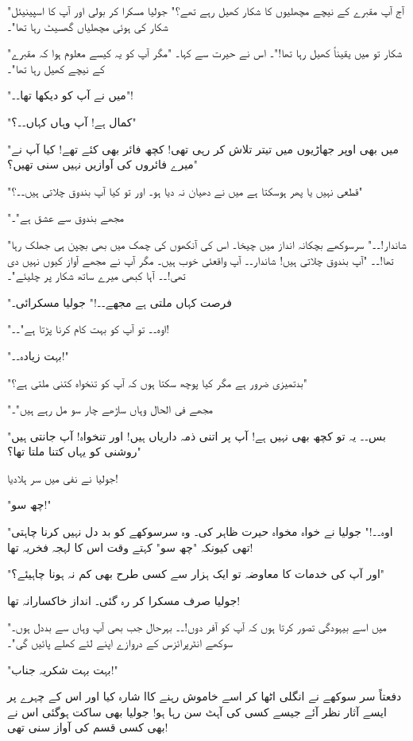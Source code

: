 "آج آپ مقبرے کے نیچے مچھلیوں کا شکار کھیل رہے تھے؟" جولیا مسکرا کر بولی اور آپ کا اسپینیئل شکار کی ہوئی مچھلیاں گھسیٹ رہا تھا"۔

"شکار تو میں یقیناً کھیل رہا تھا!"۔ اس نے حیرت سے کہا۔ "مگر آپ کو یہ کیسے معلوم ہوا کہ مقبرے کے نیچے کھیل رہا تھا"۔

"میں نے آپ کو دیکھا تھا۔۔"!

"کمال ہے! آپ وہاں کہاں۔۔؟"

"میں بھی اوپر جھاڑیوں میں تیتر تلاش کر رہی تھی! کچھ فائر بھی کئے تھے! کیا آپ نے میرے فائروں کی آوازیں نہیں سنی تھیں؟"

"قطعی نہیں یا پھر ہوسکتا ہے میں نے دھیان نہ دیا ہو۔ اور تو کیا آپ بندوق چلاتی ہیں۔۔؟"

"مجھے بندوق سے عشق ہے"۔

"شاندار!۔۔" سرسوکھے بچکانہ انداز میں چیخا۔ اس کی آنکھوں کی چمک میں بھی بچپن ہی جھلک رہا تھا!۔۔ "آپ بندوق چلاتی ہیں! شاندار۔۔ آپ واقعئی خوب ہیں۔ مگر آپ نے مجھے آواز کیوں نہیں دی تھی!۔۔ آہا کبھی میرے ساتھ شکار پر چلیئے"۔

"فرصت کہاں ملتی ہے مجھے۔۔!" جولیا مسکرائی۔

"اوہ۔۔ تو آپ کو بہت کام کرنا پڑتا ہے"۔۔!

"بہت زیادہ۔۔!"

"بدتمیزی ضرور ہے مگر کیا پوچھ سکتا ہوں کہ آپ کو تنخواہ کتنی ملتی ہے؟"

"مجھے فی الحال وہاں ساڑھے چار سو مل رہے ہیں"۔

"بس۔۔ یہ تو کچھ بھی نہیں ہے! آپ پر اتنی ذمہ داریاں ہیں! اور تنخواہ! آپ جانتی ہیں روشنی کو یہاں کتنا ملتا تھا؟"

جولیا نے نفی میں سر ہلادیا!

"چھ سو!"

"اوہ۔۔!" جولیا نے خواہ مخواہ حیرت ظاہر کی۔ وہ سرسوکھے کو بد دل نہیں کرنا چاہتی تھی کیونکہ "چھ سو" کہتے وقت اس کا لہجہ فخریہ تھا!

"اور آپ کی خدمات کا معاوضہ تو ایک ہزار سے کسی طرح بھی کم نہ ہونا چاہیئے؟"

جولیا صرف مسکرا کر رہ گئی۔ انداز خاکسارانہ تھا!

"میں اسے بیہودگی تصور کرتا ہوں کہ آپ کو آفر دوں!۔۔ بہرحال جب بھی آپ وہاں سے بددل ہوں۔ سوکھے انٹرپرائزس کے دروازے اپنے لئے کھلے پائیں گی"۔

"بہت بہت شکریہ جناب!"

دفعتاً سر سوکھے نے انگلی اٹھا کر اسے خاموش رہنے کاا شارہ کیا اور اس کے چہرے پر ایسے آثار نظر آئے جیسے کسی کی آہٹ سن رہا ہو! جولیا بھی ساکت ہوگئی اس نے بھی کسی قسم کی آواز سنی تھی!

